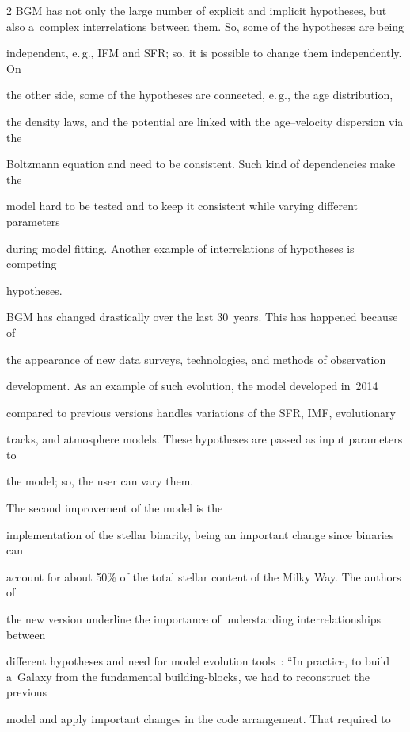 \begin{multicols}{2}
  BGM has not only the large number of explicit and implicit hypotheses, but also a~complex interrelations between them. So, some of the hypotheses are being


independent, e.\,g., IFM and SFR; so, it is possible to change them independently. On


the other side, some of the hypotheses are connected, e.\,g., the age distribution,


the density laws, and the potential are linked with the age--velocity dispersion via the


Boltzmann equation and need to be consistent. Such kind of dependencies make the


model hard to be tested and to keep it consistent while varying different parameters


during model fitting. Another example of interrelations of hypotheses is competing


hypotheses.





  BGM has changed drastically over the last 30~years. This has happened because of


the appearance of new data surveys, technologies, and methods of observation


development. As an example of such evolution, the model developed in~2014


compared to previous versions handles variations of the SFR, IMF, evolutionary


tracks, and atmosphere models. These hypotheses are passed as input parameters to


the model; so, the user can vary them.





The second improvement of the model is the


implementation of the stellar binarity, being an important change since binaries can


account for about 50\% of the total stellar content of the Milky Way. The authors of


the new version underline the importance of understanding interrelationships between


different hypotheses and need for model evolution tools~\cite{60-kl}: ``In practice, to build a~Galaxy from the fundamental building-blocks, we had to reconstruct the previous


model and apply important changes in the code arrangement. That required to



\end{multicols}
